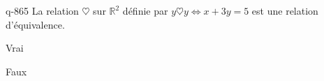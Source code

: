 \begin{truefalse}{q-865}
La relation $\heartsuit$ sur $\mathbb R^2$ définie par $y\heartsuit y \iff x+3y=5$ est une relation d'équivalence.
\item Vrai
\item* Faux
\end{truefalse}

